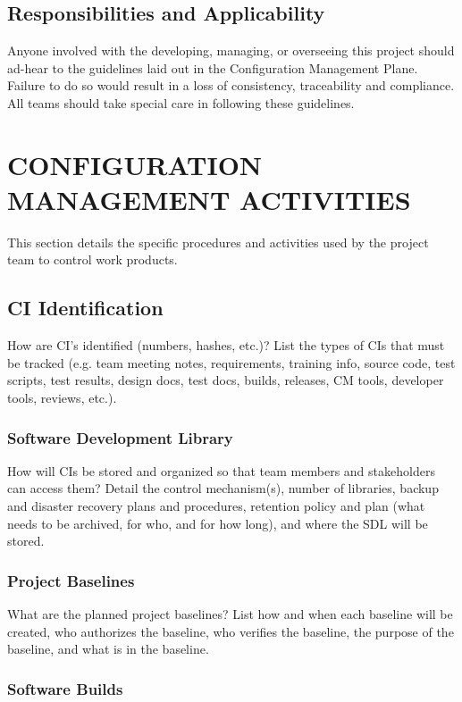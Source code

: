 \documentclass[letterpaper,12pt,oneside,listof=totoc]{scrreprt}
\begin{document}
\section{Responsibilities and Applicability}
Anyone involved with the developing, managing, or overseeing this project should ad-hear to the guidelines laid out in the Configuration Management Plane. Failure to do so would result in a loss of consistency, traceability and compliance. All teams should take special care in following these guidelines. 

\chapter{CONFIGURATION MANAGEMENT ACTIVITIES}

This section details the specific procedures and activities used by the project team to control work products.

\section{CI Identification}

How are CI's identified (numbers, hashes, etc.)? List the types of CIs that must be tracked (e.g. team meeting notes, requirements, training info, source code, test scripts, test results, design docs, test docs, builds, releases, CM tools, developer tools, reviews, etc.).

\subsection{Software Development Library}

How will CIs be stored and organized so that team members and stakeholders can access them? Detail the control mechanism(s), number of libraries, backup and disaster recovery plans and procedures, retention policy and plan (what needs to be archived, for who, and for how long), and where the SDL will be stored.

\subsection{Project Baselines}

What are the planned project baselines? List how and when each baseline will be created, who authorizes the baseline, who verifies the baseline, the purpose of the baseline, and what is in the baseline.

\subsection{Software Builds}
\end{document}

